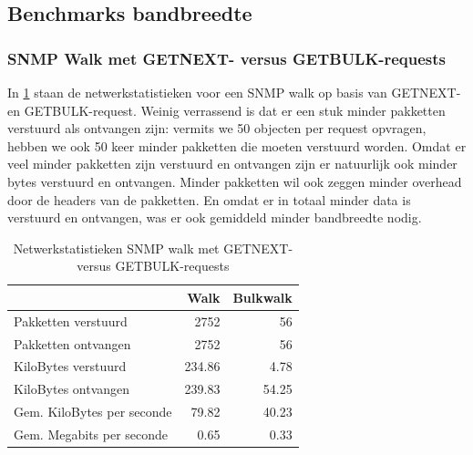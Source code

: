 \subsection{Benchmarks bandbreedte}





\subsubsection{SNMP Walk met GETNEXT- versus GETBULK-requests}

In \cref{tabel-bandbreedte-walk-vs-bulk} staan de netwerkstatistieken voor een SNMP walk op basis van GETNEXT- en GETBULK-request.
Weinig verrassend is dat er een stuk minder pakketten verstuurd als ontvangen zijn:
vermits we 50 objecten per request opvragen, hebben we ook 50 keer minder pakketten die moeten verstuurd worden.
Omdat er veel minder pakketten zijn verstuurd en ontvangen zijn er natuurlijk ook minder bytes verstuurd en ontvangen.
Minder pakketten wil ook zeggen minder overhead door de headers van de pakketten.
En omdat er in totaal minder data is verstuurd en ontvangen, was er ook gemiddeld minder bandbreedte nodig.


\begin{table}[h]
\centering
\begin{tabular}{@{}lrr@{}}
\toprule
                           & Walk   & Bulkwalk \\ \midrule
Pakketten verstuurd        & 2752   & 56       \\
Pakketten ontvangen        & 2752   & 56       \\
KiloBytes verstuurd        & 234.86 & 4.78     \\
KiloBytes ontvangen        & 239.83 & 54.25    \\
Gem. KiloBytes per seconde & 79.82  & 40.23    \\
Gem. Megabits per seconde  & 0.65   & 0.33     \\ \bottomrule
\end{tabular}
\caption{Netwerkstatistieken SNMP walk met GETNEXT- versus GETBULK-requests}
\label{tabel-bandbreedte-walk-vs-bulk}
\end{table}

